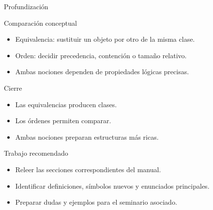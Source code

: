 \documentclass[aspectratio=169,11pt]{beamer}
\begin{document}
\begin{frame}{Profundización}
\begin{block}{Comparación conceptual}
\begin{itemize}
  \item Equivalencia: sustituir un objeto por otro de la misma clase.
  \item Orden: decidir precedencia, contención o tamaño relativo.
  \item Ambas nociones dependen de propiedades lógicas precisas.
\end{itemize}
\end{block}
\end{frame}

\begin{frame}{Cierre}
\begin{itemize}
  \item Las equivalencias producen clases.
  \item Los órdenes permiten comparar.
  \item Ambas nociones preparan estructuras más ricas.
\end{itemize}
\end{frame}

\begin{frame}{Trabajo recomendado}
\begin{itemize}
  \item Releer las secciones correspondientes del manual.
  \item Identificar definiciones, símbolos nuevos y enunciados principales.
  \item Preparar dudas y ejemplos para el seminario asociado.
\end{itemize}
\end{frame}
\end{document}
